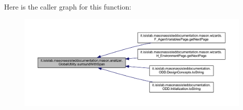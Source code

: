 Here is the caller graph for this function\-:
\nopagebreak
\begin{figure}[H]
\begin{center}
\leavevmode
\includegraphics[width=350pt]{classit_1_1isislab_1_1masonassisteddocumentation_1_1mason_1_1analizer_1_1_global_utility_a34ef4730213af90fec963a5b86f992b4_icgraph}
\end{center}
\end{figure}




